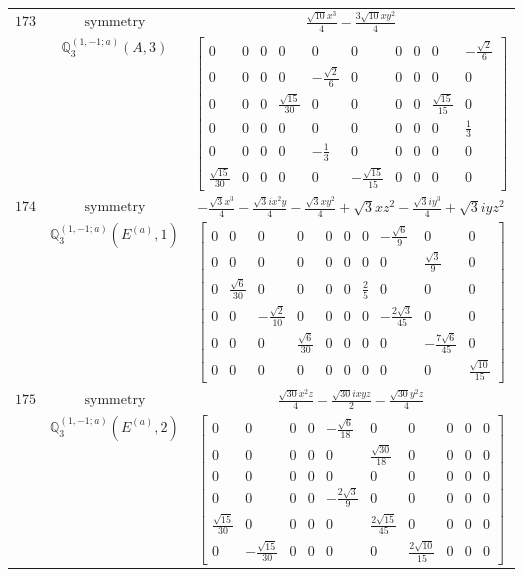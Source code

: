 \documentclass[fleqn,8pt,landscape]{jsarticle}
\begin{document}
\begin{longtable}{ccc}
$ 173 $ & $ \text{symmetry} $ & $ \frac{\sqrt{10} x^{3}}{4} - \frac{3 \sqrt{10} x y^{2}}{4} $ \\
$  $ & $ \mathbb{Q}_{3}^{(1,-1;a)}(A,3) $ & $ \begin{bmatrix} 0 & 0 & 0 & 0 & 0 & 0 & 0 & 0 & 0 & - \frac{\sqrt{2}}{6} \\ 0 & 0 & 0 & 0 & - \frac{\sqrt{2}}{6} & 0 & 0 & 0 & 0 & 0 \\ 0 & 0 & 0 & \frac{\sqrt{15}}{30} & 0 & 0 & 0 & 0 & \frac{\sqrt{15}}{15} & 0 \\ 0 & 0 & 0 & 0 & 0 & 0 & 0 & 0 & 0 & \frac{1}{3} \\ 0 & 0 & 0 & 0 & - \frac{1}{3} & 0 & 0 & 0 & 0 & 0 \\ \frac{\sqrt{15}}{30} & 0 & 0 & 0 & 0 & - \frac{\sqrt{15}}{15} & 0 & 0 & 0 & 0 \end{bmatrix} $ \\ \hline
$ 174 $ & $ \text{symmetry} $ & $ - \frac{\sqrt{3} x^{3}}{4} - \frac{\sqrt{3} i x^{2} y}{4} - \frac{\sqrt{3} x y^{2}}{4} + \sqrt{3} x z^{2} - \frac{\sqrt{3} i y^{3}}{4} + \sqrt{3} i y z^{2} $ \\
$  $ & $ \mathbb{Q}_{3}^{(1,-1;a)}(E^{(a)},1) $ & $ \begin{bmatrix} 0 & 0 & 0 & 0 & 0 & 0 & 0 & - \frac{\sqrt{6}}{9} & 0 & 0 \\ 0 & 0 & 0 & 0 & 0 & 0 & 0 & 0 & \frac{\sqrt{3}}{9} & 0 \\ 0 & \frac{\sqrt{6}}{30} & 0 & 0 & 0 & 0 & \frac{2}{5} & 0 & 0 & 0 \\ 0 & 0 & - \frac{\sqrt{2}}{10} & 0 & 0 & 0 & 0 & - \frac{2 \sqrt{3}}{45} & 0 & 0 \\ 0 & 0 & 0 & \frac{\sqrt{6}}{30} & 0 & 0 & 0 & 0 & - \frac{7 \sqrt{6}}{45} & 0 \\ 0 & 0 & 0 & 0 & 0 & 0 & 0 & 0 & 0 & \frac{\sqrt{10}}{15} \end{bmatrix} $ \\ \hline
$ 175 $ & $ \text{symmetry} $ & $ \frac{\sqrt{30} x^{2} z}{4} - \frac{\sqrt{30} i x y z}{2} - \frac{\sqrt{30} y^{2} z}{4} $ \\
$  $ & $ \mathbb{Q}_{3}^{(1,-1;a)}(E^{(a)},2) $ & $ \begin{bmatrix} 0 & 0 & 0 & 0 & - \frac{\sqrt{6}}{18} & 0 & 0 & 0 & 0 & 0 \\ 0 & 0 & 0 & 0 & 0 & \frac{\sqrt{30}}{18} & 0 & 0 & 0 & 0 \\ 0 & 0 & 0 & 0 & 0 & 0 & 0 & 0 & 0 & 0 \\ 0 & 0 & 0 & 0 & - \frac{2 \sqrt{3}}{9} & 0 & 0 & 0 & 0 & 0 \\ \frac{\sqrt{15}}{30} & 0 & 0 & 0 & 0 & \frac{2 \sqrt{15}}{45} & 0 & 0 & 0 & 0 \\ 0 & - \frac{\sqrt{15}}{30} & 0 & 0 & 0 & 0 & \frac{2 \sqrt{10}}{15} & 0 & 0 & 0 \end{bmatrix} $ \\ \hline

\end{longtable}
\end{document}
